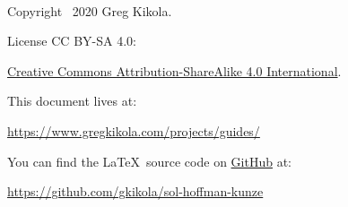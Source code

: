 \ \vspace{30mm}

\noindent Copyright \textcopyright\ 2020 Greg Kikola.

\noindent License CC BY-SA 4.0:
\begin{center}
  \href{http://creativecommons.org/licenses/by-sa/4.0/}{Creative Commons
  Attribution-ShareAlike 4.0 International}.
\end{center}
\vspace{30mm}

\noindent This document lives at:
\begin{center}
  \href{https://www.gregkikola.com/projects/guides/}
  {https://www.gregkikola.com/projects/guides/}
\end{center}
You can find the \LaTeX\ source code on
\href{https://github.com/}{GitHub} at:
\begin{center}
  \href{https://github.com/gkikola/sol-hoffman-kunze}
  {https://github.com/gkikola/sol-hoffman-kunze}
\end{center}
